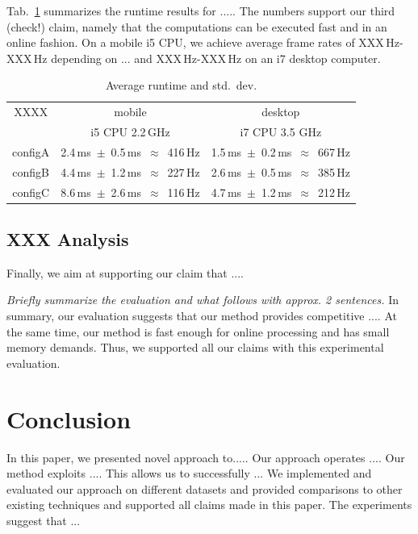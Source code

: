 \documentclass[letterpaper, 10 pt, conference]{ieeeconf}  %
\def\tabref#1{Tab.~\ref{#1}}
\begin{document}
\tabref{tab:speed} summarizes the runtime results for .....  The
numbers support our third (check!) claim, namely that the computations
can be executed fast and in an online fashion.  On a mobile i5 CPU, we
achieve average frame rates of XXX\,Hz-XXX\,Hz depending on ... and
XXX\,Hz-XXX\,Hz on an i7 desktop computer.
 
\begin{table}
\caption{Average runtime and std.~dev.}
\centering
{\footnotesize
\begin{tabular}{|c|c|c|}
\hline
XXXX & mobile & desktop \\
 & i5 CPU 2.2\,GHz & i7 CPU 3.5 GHz\\
\hline
configA & 2.4\,ms~$\pm$~0.5\,ms~$\approx$~416\,Hz & 1.5\,ms~$\pm$~0.2\,ms~$\approx$~667\,Hz \\
configB & 4.4\,ms~$\pm$~1.2\,ms~$\approx$~227\,Hz & 2.6\,ms~$\pm$~0.5\,ms~$\approx$~385\,Hz \\
configC & 8.6\,ms~$\pm$~2.6\,ms~$\approx$~116\,Hz & 4.7\,ms~$\pm$~1.2\,ms~$\approx$~212\,Hz \\
\hline
\end{tabular}
}
\label{tab:speed}
\end{table}

\subsection{XXX Analysis}

Finally, we aim at supporting our claim that ....

\emph{Briefly summarize the evaluation and what follows with approx. 2
  sentences.}  In summary, our evaluation suggests that our method
provides competitive .... At the same time, our method is fast enough
for online processing and has small memory demands. Thus, we supported
all our claims with this experimental evaluation.


\section{Conclusion}
\label{sec:conclusion}

In this paper, we presented novel approach to.....  
Our approach operates ....  Our method exploits ....  
This allows us to successfully ...  
We implemented and evaluated our approach on different datasets
and provided comparisons to other existing techniques and supported
all claims made in this paper. The experiments suggest that ...
\end{document}

